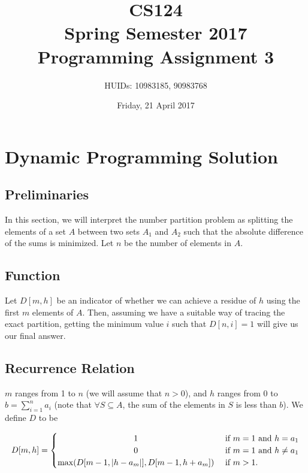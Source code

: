 \documentclass[10pt,letter]{article}
\title{
  CS124                    \\
  Spring Semester 2017     \\
  Programming Assignment 3
}
\author{HUIDs: 10983185, 90983768}
\date{Friday, 21 April 2017}
\begin{document}
\sloppy
 
\maketitle 

\section{Dynamic Programming Solution}

\subsection{Preliminaries}

In this section, we will interpret the number partition problem as splitting the elements of a set $A$ between two sets $A_1$ and $A_2$ such that the absolute difference of the sums is minimized. Let $n$ be the number of elements in $A$.

\subsection{Function}

Let $D[m, h]$ be an indicator of whether we can achieve a residue of $h$ using the first $m$ elements of $A$. Then, assuming we have a suitable way of tracing the exact partition, getting the minimum value $i$ such that $D[n, i] = 1$ will give us our final answer.

\subsection{Recurrence Relation}

$m$ ranges from 1 to $n$ (we will assume that $n > 0$), and $h$ ranges from $0$ to $b = \sum\limits_{i = 1}^n a_i$ (note that $\forall S \subseteq A$, the sum of the elements in $S$ is less than $b$). We define $D$ to be

\medskip

\[
  D[m, h] =
  \begin{cases} 
    \hfill 1 \hfill & \text{ if $m = 1$ and $h = a_1$} \\
    \hfill 0 \hfill & \text{ if $m = 1$ and $h \neq a_1$} \\
    \hfill \max(D[m - 1, \vert h - a_m \vert], D[m - 1, h + a_m]) & \text{ if $m > 1$.} \\
  \end{cases}
\]

\medskip
\end{document}
